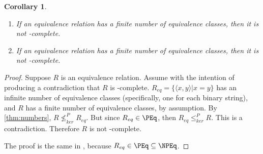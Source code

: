 \documentclass{article}
\newtheorem{corollary}[corollary]{Corollary}
\theoremstyle{definition} \newtheorem{definition}[definition]{Definition}
\newcommand{\kr}{\leq^{P}_{ker}} %
\newcommand{\nkr}{\nleq^{P}_{ker}} %
\newcommand{\pair}[2]{\langle#1,#2\rangle} %
\begin{document}
\begin{corollary}\label{cor:finite}
  \mbox{}
  \begin{enumerate}
    \renewcommand{\labelenumi}{\roman{enumi}.}
  \item If an equivalence relation has a finite number of equivalence classes,
    then it is not \PEq-complete.
  \item If an equivalence relation has a finite number of equivalence classes,
    then it is not \NPEq-complete.
  \end{enumerate}
\end{corollary}
\begin{proof}
  Suppose $R$ is an equivalence relation. Assume with the intention of
  producing a contradiction that $R$ is
  \PEq-complete. $R_{eq}=\{\pair{x}{y}|x=y\}$ has an infinite number of
  equivalence classes (specifically, one for each binary string), and $R$ has a
  finite number of equivalence classes, by assumption. By
  \autoref{thm:numbers}, $R\nkr R_{eq}$. But since $R_{eq}\in\PEq$, then
  $R_{eq}\kr R$. This is a contradiction. Therefore $R$ is not \PEq-complete.

  The proof is the same in \NPEq, because $R_{eq}\in\PEq\subseteq\NPEq$.
\end{proof}
\end{document}
